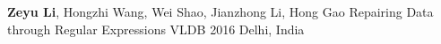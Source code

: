 \begin{cventries}
  \cventry
    {\textbf{Zeyu Li}, Hongzhi Wang, Wei Shao, Jianzhong Li, Hong Gao}
    {Repairing Data through Regular Expressions}
    {VLDB 2016}
    {Delhi, India}
    {}
\end{cventries}
